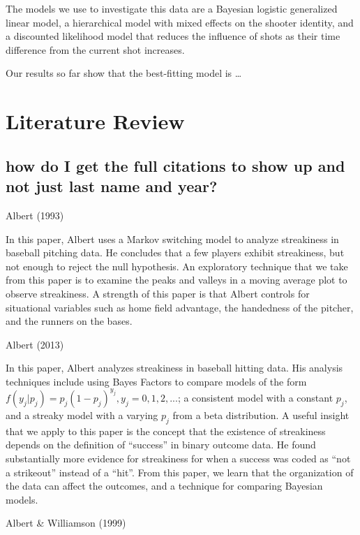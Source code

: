 \documentclass[12pt,twoside]{dukestatscithesis}
\theoremstyle{definition}
\theoremstyle{definition}
\theoremstyle{definition}
\theoremstyle{remark}
\begin{document}
The models we use to investigate this data are a Bayesian logistic
generalized linear model, a hierarchical model with mixed effects on the
shooter identity, and a discounted likelihood model that reduces the
influence of shots as their time difference from the current shot
increases.

Our results so far show that the best-fitting model is \ldots{}

\chapter{Literature Review}\label{litreview}

\section{how do I get the full citations to show up and not just last
name and
year?}\label{how-do-i-get-the-full-citations-to-show-up-and-not-just-last-name-and-year}

Albert (1993)

In this paper, Albert uses a Markov switching model to analyze
streakiness in baseball pitching data. He concludes that a few players
exhibit streakiness, but not enough to reject the null hypothesis. An
exploratory technique that we take from this paper is to examine the
peaks and valleys in a moving average plot to observe streakiness. A
strength of this paper is that Albert controls for situational variables
such as home field advantage, the handedness of the pitcher, and the
runners on the bases.

Albert (2013)

In this paper, Albert analyzes streakiness in baseball hitting data. His
analysis techniques include using Bayes Factors to compare models of the
form \(f(y_j|p_j) = p_j(1-p_j)^{y_j}, y_j = 0,1,2,...\); a consistent
model with a constant \(p_j\), and a streaky model with a varying
\(p_j\) from a beta distribution. A useful insight that we apply to this
paper is the concept that the existence of streakiness depends on the
definition of ``success'' in binary outcome data. He found substantially
more evidence for streakiness for when a success was coded as ``not a
strikeout'' instead of a ``hit''. From this paper, we learn that the
organization of the data can affect the outcomes, and a technique for
comparing Bayesian models.

Albert \& Williamson (1999)
\end{document}
